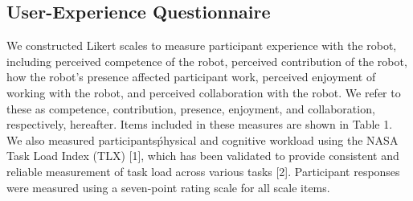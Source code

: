 \subsection{User-Experience Questionnaire}
       We constructed Likert scales to measure participant experience with the robot, including perceived competence of the robot, perceived contribution of the robot, how the robot's presence affected participant work, perceived enjoyment of working with the robot, and perceived collaboration with the robot. We refer to these as competence, contribution, presence, enjoyment, and collaboration, respectively, hereafter. Items included in these measures are shown in Table 1. We also measured participants\' physical and cognitive workload using the NASA Task Load Index (TLX) [1], which has been validated to provide consistent and reliable measurement of task load across various tasks [2]. Participant responses were measured using a seven-point rating scale for all scale items.
 
